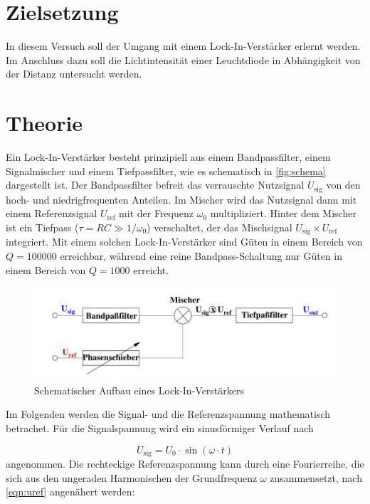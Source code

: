 \section*{Zielsetzung}
\label{sec:Zielsetzung}
In diesem Versuch soll der Umgang mit einem Lock-In-Verstärker erlernt werden. Im Anschluss
dazu soll die Lichtintensität einer Leuchtdiode in Abhängigkeit von der Distanz untersucht
werden.

\section{Theorie}
\label{sec:Theorie}
Ein Lock-In-Verstärker besteht prinzipiell aus einem Bandpassfilter, einem Signalmischer und einem Tiefpassfilter, wie es schematisch in \autoref{fig:schema} dargestellt ist. Der Bandpassfilter befreit das verrauschte Nutzsignal $U_\text{sig}$ von den hoch- und niedrigfrequenten Anteilen. Im Mischer wird das Nutzsignal dann mit einem Referenzsignal $U_\text{ref}$ mit der Frequenz $\omega_0$ multipliziert. Hinter dem Mischer ist ein Tiefpass ($\tau = RC ≫ 1/\omega_0$) verschaltet,  der das Mischsignal  $U_\text{sig} \times U_\text{ref}$ integriert. Mit einem solchen Lock-In-Verstärker sind Güten in einem Bereich von $Q=100000$ erreichbar, während eine reine Bandpass-Schaltung nur Güten in einem Bereich von $Q=1000$ erreicht.
\begin{figure}[H]
    \centering
    \includegraphics{images/schema.JPG}
    \caption{Schematischer Aufbau eines Lock-In-Verstärkers\cite{sample}}
    \label{fig:schema}
\end{figure}
\noindent
Im Folgenden werden die Signal- und die Referenzspannung mathematisch betrachet.
Für die Signalspannung wird ein sinusförmiger Verlauf nach  

\begin{equation}
    U_\text{sig} = U_0 \cdot \sin(\omega \cdot t)
    \label{eqn:usig}
\end{equation}
\noindent
angenommen.
Die rechteckige Referenzspannung kann durch eine Fourierreihe, die sich aus den ungeraden Harmonischen der Grundfrequenz $\omega$ zusammensetzt, nach \autoref{eqn:uref} angenähert werden:

